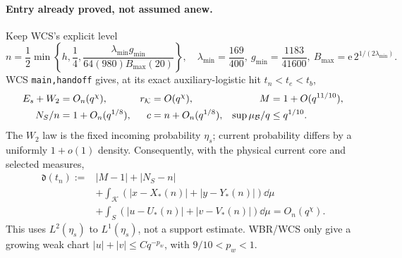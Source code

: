 \documentclass[11pt]{article}
\numberwithin{equation}{section}
\theoremstyle{remark}\newtheorem{remark}[theorem]{Remark}
\newcommand{\KK}{\mathcal K}\newcommand{\BB}{\mathcal B}
\newcommand{\dist}{\mathfrak d}
\begin{document}
\paragraph{Entry already proved, not assumed anew.}
Keep WCS's explicit level
\[
 n=\frac12\min\left\{h,\frac14,
 \frac{\lambda_{\min}g_{\min}}{64(980)B_{\max}(20)}\right\},
 \quad \lambda_{\min}=\frac{169}{400},\
 g_{\min}=\frac{1183}{41600},\
 B_{\max}=\mathrm e\,2^{1/(2\lambda_{\min})}.
\]
WCS \texttt{main,handoff} gives, at its exact auxiliary-logistic hit
\(t_n<t_e<t_b\),
\begin{align}
 E_s+W_2&=O_n(q^\chi),&
 r_\KK&=O(q^\chi),&
 M&=1+O(q^{11/10}), \notag\\
 N_S/n&=1+O_n(q^{1/8}),&
 c&=n+O_n(q^{1/8}),&
 \sup\mu_\BB/q&\le q^{1/10}.
 \label{an07cwiv1:entry}
\end{align}
The \(W_2\) law is the fixed incoming probability \(\eta_s\);
current probability differs by a uniformly \(1+o(1)\) density.
Consequently, with the physical current core and selected measures,
\begin{equation}
 \begin{split}
 \dist(t_n):={}&|M-1|+|N_S-n|\\
 &+\int_\KK(|x-X_*(n)|+|y-Y_*(n)|)\dd\mu\\
 &+\int_S(|u-U_*(n)|+|v-V_*(n)|)\dd\mu
 =O_n(q^\chi).
 \end{split}
 \label{an07cwiv1:entrydistance}
\end{equation}
This uses \(L^2(\eta_s)\) to \(L^1(\eta_s)\), not a support
estimate. WBR/WCS only give a growing weak chart
\(|u|+|v|\le Cq^{-p_w}\), with \(9/10<p_w<1\).
\end{document}

